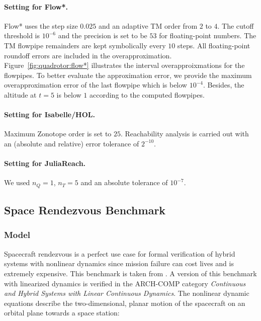\documentclass[EPiC]{easychair}
\begin{document}
\paragraph{Setting for Flow*.}
Flow* uses the step size $0.025$ and an adaptive TM order from $2$ to $4$. The cutoff threshold is $10^{-6}$ and the precision is set to be $53$ for floating-point numbers. The TM flowpipe remainders are kept symbolically every $10$ steps. All floating-point roundoff errors are included in the overapproximation. Figure~\ref{fig:quadrotor:flow*} illustrates the interval overapproixmations for the flowpipes. To better evaluate the approximation error, we provide the maximum overapproximation error of the last flowpipe which is below $10^{-4}$. Besides, the altitude at $t=5$ is below $1$ according to the computed flowpipes.

\paragraph{Setting for Isabelle/HOL.}
Maximum Zonotope order is set to $25$. Reachability analysis is carried out with an (absolute and relative) error tolerance of $2^{-10}$.

\paragraph{Setting for JuliaReach.} We used $n_Q=1$, $n_T=5$ and an absolute tolerance of $10^{-7}$.


\clearpage

\subsection{Space Rendezvous Benchmark}
\label{sec:spacerendezvous}

\subsubsection{Model}

Spacecraft rendezvous is a perfect use case for formal verification of hybrid systems with nonlinear dynamics since mission failure can cost lives and is extremely expensive. This benchmark is taken from \cite{Chan2017a}. A version of this benchmark with linearized dynamics is verified in the ARCH-COMP category \textit{Continuous and Hybrid Systems with Linear Continuous Dynamics}. The nonlinear dynamic equations describe the two-dimensional, planar motion of the spacecraft on an orbital plane towards a space station:
\end{document}
